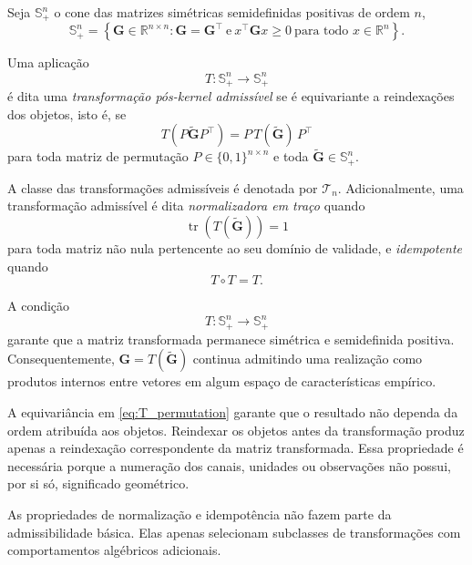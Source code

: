 \begin{definition}
\label{def:T_admissible}
Seja $\mathbb{S}_+^n$ o cone das matrizes simétricas semidefinidas positivas de ordem $n$,
\begin{equation}\label{eq:psd_cone}
    \mathbb{S}_+^n =
    \left\{
        \mathbf{G}\in\mathbb{R}^{n\times n}
        :
        \mathbf{G}=\mathbf{G}^{\top}
        \ \text{e}\
        x^{\top}\mathbf{G}x\geq 0
        \ \text{para todo }x\in\mathbb{R}^n
    \right\}.
\end{equation}

Uma aplicação
\begin{equation*}
    T:
    \mathbb{S}_+^n
    \longrightarrow
    \mathbb{S}_+^n
\end{equation*}
é dita uma \emph{transformação pós-\textit{kernel} admissível} se é equivariante a reindexações dos objetos, isto é, se
\begin{equation}\label{eq:T_permutation}
    T(P\widetilde{\mathbf{G}}P^\top) = P\,T(\widetilde{\mathbf{G}})\,P^\top
\end{equation}
para toda matriz de permutação
$P\in\{0,1\}^{n\times n}$
e toda
$\widetilde{\mathbf{G}}\in\mathbb{S}_+^n$.

A classe das transformações admissíveis é denotada por $\mathcal{T}_n$. Adicionalmente, uma transformação admissível é dita \emph{normalizadora em traço} quando
\begin{equation}
    \operatorname{tr}
    \left(
        T(\widetilde{\mathbf{G}})
    \right) = 1
\end{equation}
para toda matriz não nula pertencente ao seu domínio de validade, e \emph{idempotente} quando
\begin{equation}
    T\circ T = T.
\end{equation}
\end{definition}

\begin{remark}
\label{rem:T_axioms}
A condição
\begin{equation*}
    T: \mathbb{S}_+^n \longrightarrow \mathbb{S}_+^n
\end{equation*}
garante que a matriz transformada permanece simétrica e semidefinida positiva. Consequentemente,
$\mathbf{G}=T(\widetilde{\mathbf{G}})$
continua admitindo uma realização como produtos internos entre vetores em algum espaço de características empírico.

A equivariância em \eqref{eq:T_permutation} garante que o resultado não dependa da ordem atribuída aos objetos. Reindexar os objetos antes da transformação produz apenas a reindexação correspondente da matriz transformada. Essa propriedade é necessária porque a numeração dos canais, unidades ou observações não possui, por si só, significado geométrico.

As propriedades de normalização e idempotência não fazem parte da admissibilidade básica. Elas apenas selecionam subclasses de transformações com comportamentos algébricos adicionais.
\end{remark}

